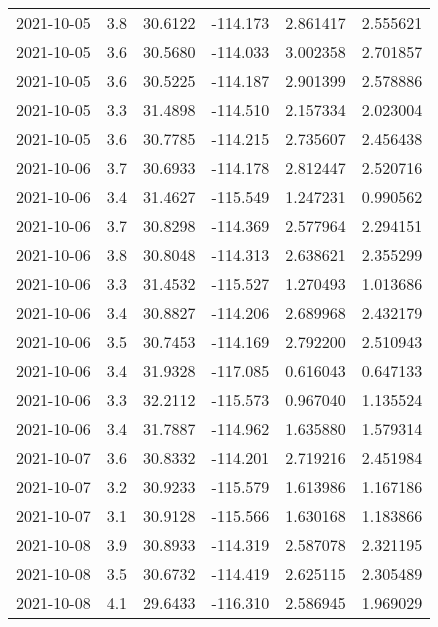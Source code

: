 \begin{tabular}{lrrrrr}
2021-10-05 &       3.8 &  30.6122 &  -114.173 &         2.861417 &         2.555621 \\
2021-10-05 &       3.6 &  30.5680 &  -114.033 &         3.002358 &         2.701857 \\
2021-10-05 &       3.6 &  30.5225 &  -114.187 &         2.901399 &         2.578886 \\
2021-10-05 &       3.3 &  31.4898 &  -114.510 &         2.157334 &         2.023004 \\
2021-10-05 &       3.6 &  30.7785 &  -114.215 &         2.735607 &         2.456438 \\
2021-10-06 &       3.7 &  30.6933 &  -114.178 &         2.812447 &         2.520716 \\
2021-10-06 &       3.4 &  31.4627 &  -115.549 &         1.247231 &         0.990562 \\
2021-10-06 &       3.7 &  30.8298 &  -114.369 &         2.577964 &         2.294151 \\
2021-10-06 &       3.8 &  30.8048 &  -114.313 &         2.638621 &         2.355299 \\
2021-10-06 &       3.3 &  31.4532 &  -115.527 &         1.270493 &         1.013686 \\
2021-10-06 &       3.4 &  30.8827 &  -114.206 &         2.689968 &         2.432179 \\
2021-10-06 &       3.5 &  30.7453 &  -114.169 &         2.792200 &         2.510943 \\
2021-10-06 &       3.4 &  31.9328 &  -117.085 &         0.616043 &         0.647133 \\
2021-10-06 &       3.3 &  32.2112 &  -115.573 &         0.967040 &         1.135524 \\
2021-10-06 &       3.4 &  31.7887 &  -114.962 &         1.635880 &         1.579314 \\
2021-10-07 &       3.6 &  30.8332 &  -114.201 &         2.719216 &         2.451984 \\
2021-10-07 &       3.2 &  30.9233 &  -115.579 &         1.613986 &         1.167186 \\
2021-10-07 &       3.1 &  30.9128 &  -115.566 &         1.630168 &         1.183866 \\
2021-10-08 &       3.9 &  30.8933 &  -114.319 &         2.587078 &         2.321195 \\
2021-10-08 &       3.5 &  30.6732 &  -114.419 &         2.625115 &         2.305489 \\
2021-10-08 &       4.1 &  29.6433 &  -116.310 &         2.586945 &         1.969029 \\

\end{tabular}
